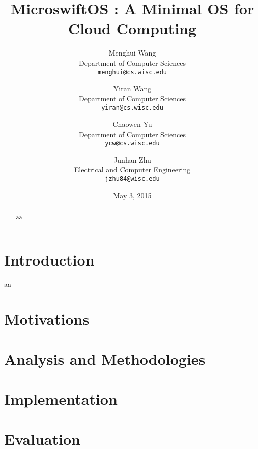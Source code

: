 \documentclass[letterpaper,11pt,twocolumn]{article}
\title{\bf{MicroswiftOS : A Minimal OS for Cloud Computing}}
\author{
  Menghui Wang\\
  Department of Computer Sciences\\
  \texttt{menghui@cs.wisc.edu}
  \and
  Yiran Wang\\
  Department of Computer Sciences\\
  \texttt{yiran@cs.wisc.edu}
  \and
  Chaowen Yu\\
  Department of Computer Sciences\\
  \texttt{ycw@cs.wisc.edu}
  \and
  Junhan Zhu\\
  Electrical and Computer Engineering\\
  \texttt{jzhu84@wisc.edu}
}
\date{May 3, 2015}
\begin{document}
\twocolumn[
\maketitle
\draft
]
\begin{abstract}
aa
\end{abstract}




\section{Introduction}
\label{sec:intro}
aa


\section{Motivations}
\label{sec:moti}

\section{Analysis and Methodologies}
\label{sec:micro}

\section{Implementation}
\label{sec:impl}

\section{Evaluation}
\label{sec:eval}

\end{document}
